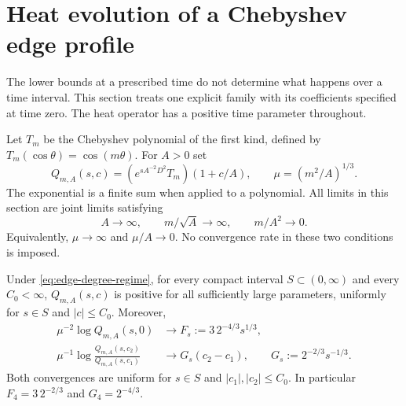 \section{Heat evolution of a Chebyshev edge profile}\label{sec:parabolic}

The lower bounds at a prescribed time do not determine what happens over
a time interval.  This section treats one explicit family with its
coefficients specified at time zero.  The heat operator has a positive
time parameter throughout.

Let $T_m$ be the Chebyshev polynomial of the first kind, defined by
$T_m(\cos\theta)=\cos(m\theta)$.  For $A>0$ set
\begin{equation}\label{eq:heat-edge-definition}
 Q_{m,A}(s,c)=
 \left(e^{sA^{-2}D^2}T_m\right)(1+c/A),
 \qquad \mu=(m^2/A)^{1/3}.
\end{equation}
The exponential is a finite sum when applied to a polynomial.
All limits in this section are joint limits satisfying
\begin{equation}\label{eq:edge-degree-regime}
 A\longrightarrow\infty,\qquad
 m/\sqrt A\longrightarrow\infty,\qquad m/A^2\longrightarrow0.
\end{equation}
Equivalently, $\mu\to\infty$ and $\mu/A\to0$.
No convergence rate in these two conditions is imposed.

\begin{theorem}\label{thm:heat-edge}
Under \eqref{eq:edge-degree-regime}, for every compact interval
$S\subset(0,\infty)$ and every $C_0<\infty$, $Q_{m,A}(s,c)$ is positive
for all sufficiently large parameters, uniformly for $s\in S$ and
$|c|\le C_0$.  Moreover,
\begin{align}
 \mu^{-2}\log Q_{m,A}(s,0)&\longrightarrow
 F_s:=3\,2^{-4/3}s^{1/3},\label{eq:heat-leading-limit}\\
 \mu^{-1}\log\frac{Q_{m,A}(s,c_2)}{Q_{m,A}(s,c_1)}
 &\longrightarrow G_s(c_2-c_1),
 \qquad G_s:=2^{-2/3}s^{-1/3}.
 \label{eq:heat-tilt-limit}
\end{align}
Both convergences are uniform for $s\in S$ and $|c_1|,|c_2|\le C_0$.
In particular $F_4=3\,2^{-2/3}$ and $G_4=2^{-4/3}$.
\end{theorem}

